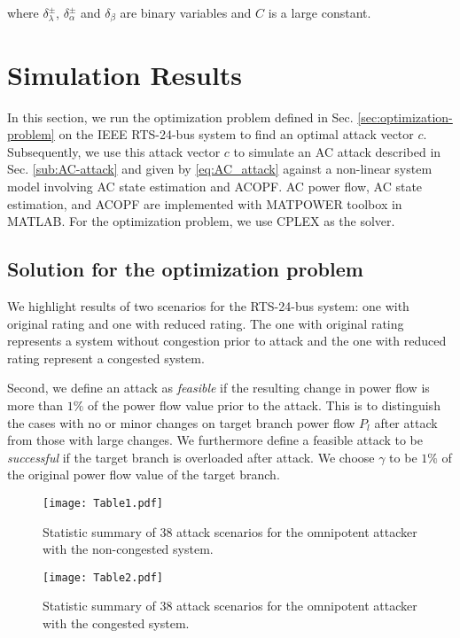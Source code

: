\documentclass[twocolumn,english,final,journal]{IEEEtran}
\theoremstyle{plain}
\theoremstyle{definition}
\begin{document}
where $\delta_{\lambda}^{\pm}$, $\delta_{\alpha}^{\pm}$ and $\delta_{\beta}$
are binary variables and $C$ is a large constant. 


\section{Simulation Results \label{sec:Simulation-Results}}

In this section, we run the optimization problem defined in Sec. \ref{sec:optimization-problem}
on the IEEE RTS-24-bus system to find an optimal attack vector $c$. Subsequently, we use this attack
vector $c$ to simulate an AC attack described in Sec. \ref{sub:AC-attack}
and given by \eqref{eq:AC_attack} against a non-linear system model
involving AC state estimation and ACOPF. AC power flow, AC state estimation,
and ACOPF are implemented with MATPOWER toolbox in MATLAB. For the
optimization problem, we use CPLEX as the solver. 


\subsection{Solution for the optimization problem\label{sub:Solution-for-the}}

We highlight results of two scenarios for the RTS-24-bus system: one
with original rating and one with reduced rating. The one with original
rating represents a system without congestion prior to attack and
the one with reduced rating represent a congested system.

Second, we define an attack as \emph{feasible} if the resulting change
in power flow is more than $1\%$ of the power flow value prior to
the attack. This is to distinguish the cases with no or minor changes
on target branch power flow $P_{l}$ after attack from those with
large changes. We furthermore define a feasible attack to be \emph{successful}
if the target branch is overloaded after attack. We choose $\gamma$
to be $1\%$ of the original power flow value of the target branch.

\begin{figure}[tbh]
\texttt{[image: Table1.pdf]}
\caption{Statistic summary of 38 attack scenarios for the omnipotent attacker
with the non-congested system. \label{Fig:table1}}
\end{figure}


\begin{figure}[tbh]
\texttt{[image: Table2.pdf]}
\caption{Statistic summary of 38 attack scenarios for the omnipotent attacker
with the congested system.\label{Fig:table2} }


\end{figure}
\end{document}
